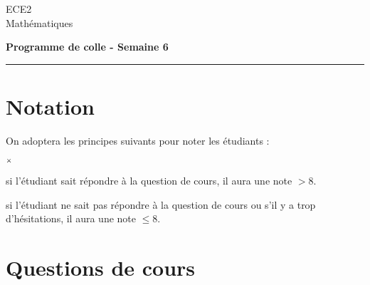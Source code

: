 \documentclass[11pt]{article}%
\begin{document}
\begin{flushleft}
ECE2 \\
Mathématiques
\end{flushleft}


\vspace{0.1cm}

\begin{center}
\textbf{\Large{Programme de colle - Semaine 6}}
\end{center}

\hrule

\vspace*{0,2cm}

\section*{Notation}

\noindent
On adoptera les principes suivants pour noter les étudiants :
\begin{noliste}{$\scriptstyle \times$}
\item si l'étudiant sait répondre à la question de cours, il 
aura une note $>8$.
\item si l'étudiant ne sait pas répondre à la question de 
cours ou s'il y a trop d'hésitations, il aura une note $\leq 8$.
\end{noliste}

\section*{Questions de cours}
\end{document}

